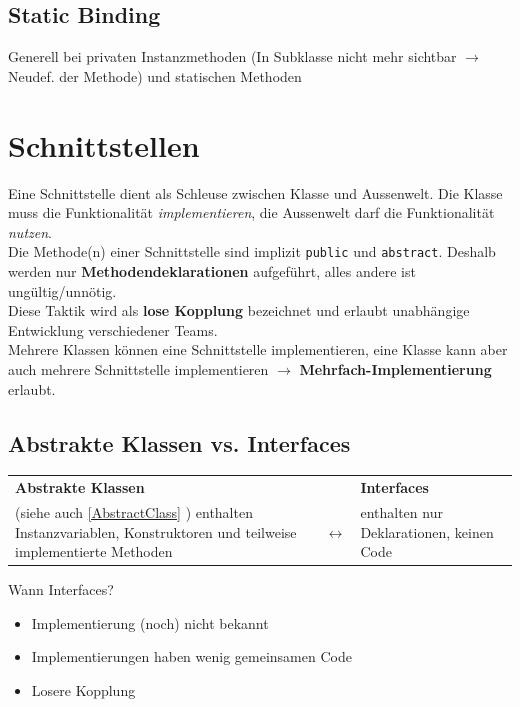 \subsection{Static Binding}
Generell bei privaten Instanzmethoden (In Subklasse nicht mehr sichtbar $\rightarrow$ Neudef. der Methode) und statischen Methoden

\section{Schnittstellen}
Eine Schnittstelle dient als Schleuse zwischen Klasse und Aussenwelt. Die Klasse muss die Funktionalität \textit{implementieren},
die Aussenwelt darf die Funktionalität \textit{nutzen}.\\
Die Methode(n) einer Schnittstelle sind implizit \verb|public| und \verb|abstract|. Deshalb werden nur \textbf{Methodendeklarationen} aufgeführt,
alles andere ist ungültig/unnötig.\\

Diese Taktik wird als \textbf{lose Kopplung} bezeichnet und erlaubt unabhängige Entwicklung verschiedener Teams.\\

Mehrere Klassen können eine Schnittstelle implementieren, eine Klasse kann aber auch mehrere Schnittstelle implementieren $\rightarrow$
\textbf{Mehrfach-Implementierung} erlaubt.

\subsection{Abstrakte Klassen vs. Interfaces}
\begin{tabularx}{\linewidth}{|X c X|} \hline
    \textbf{Abstrakte Klassen} & & \textbf{Interfaces} \\
    (siehe auch \ref{AbstractClass} ) enthalten Instanzvariablen, Konstruktoren und teilweise implementierte Methoden & $\longleftrightarrow $ & enthalten nur Deklarationen, keinen Code \\
    \hline
\end{tabularx}

Wann Interfaces?
\begin{itemize}
    \itemsep0em
    \item Implementierung (noch) nicht bekannt
    \item Implementierungen haben wenig gemeinsamen Code
    \item Losere Kopplung
\end{itemize}


